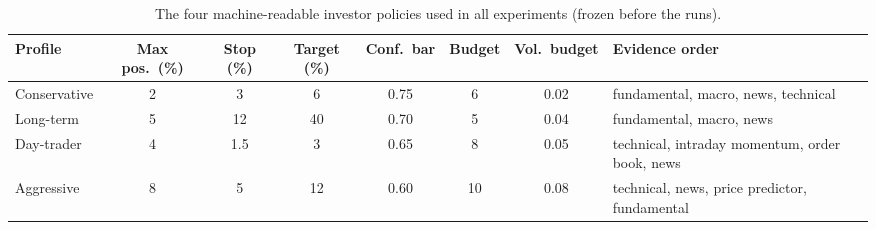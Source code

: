 \begin{table}[!t]
\centering\footnotesize
\caption{The four machine-readable investor policies used in all experiments (frozen before the runs).}
\label{tab:policy}
\begin{tabularx}{\textwidth}{lcccccc Y}
\toprule
Profile & Max pos.\ (\%) & Stop (\%) & Target (\%) & Conf.\ bar & Budget & Vol.\ budget & Evidence order \\
\midrule
Conservative & 2 & 3 & 6 & 0.75 & 6 & 0.02 & fundamental, macro, news, technical \\
Long-term & 5 & 12 & 40 & 0.70 & 5 & 0.04 & fundamental, macro, news \\
Day-trader & 4 & 1.5 & 3 & 0.65 & 8 & 0.05 & technical, intraday momentum, order book, news \\
Aggressive & 8 & 5 & 12 & 0.60 & 10 & 0.08 & technical, news, price predictor, fundamental \\
\bottomrule
\end{tabularx}
\end{table}
